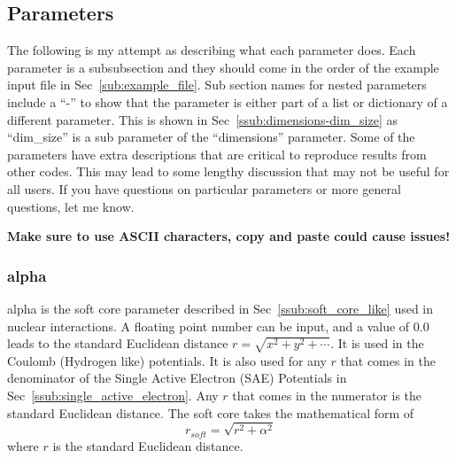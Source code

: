 \documentclass{article}
\begin{document}
\subsection{Parameters} %
\label{sub:parameters_input}
The following is my attempt as describing what each parameter does. Each parameter is a subsubsection and they should come in the order of the example input file in Sec~\ref{sub:example_file}. Sub section names for nested parameters include a ``-'' to show that the parameter is either part of a list or dictionary of a different parameter. This is shown in Sec~\ref{ssub:dimensions-dim_size} as ``dim\_size'' is a sub parameter of the ``dimensions'' parameter.  Some of the parameters have extra descriptions that are critical to reproduce results from other codes. This may lead to some lengthy discussion that may not be useful for all users. If you have questions on particular parameters or more general questions, let me know.

\textbf{Make sure to use ASCII characters, copy and paste could cause issues!}

\subsubsection{alpha}
alpha is the soft core parameter described in Sec~\ref{ssub:soft_core_like} used in nuclear interactions. A floating point number can be input, and a value of 0.0 leads to the standard Euclidean distance $r=\sqrt{x^2+y^2+\cdots}$. It is used in the Coulomb (Hydrogen like) potentials. It is also used for any $r$ that comes in the denominator of the Single Active Electron (SAE) Potentials in Sec~\ref{ssub:single_active_electron}. Any $r$ that comes in the numerator is the standard Euclidean distance. The soft core takes the mathematical form of
\begin{equation}
  r_{soft} = \sqrt{r^2 + \alpha^2}
\end{equation}
where $r$ is the standard Euclidean distance.
\end{document}
